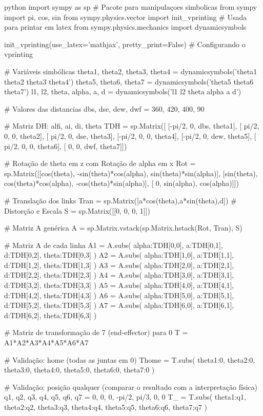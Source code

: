 \begin{mintedbox}{python}
import sympy as sp    # Pacote para manipulaçoes simbolicas
from sympy import pi, cos, sin
from sympy.physics.vector import init_vprinting   # Usada para printar em latex
from sympy.physics.mechanics import dynamicsymbols

init_vprinting(use_latex='mathjax', pretty_print=False)   # Configurando o vprinting

# Variáveis simbólicas
theta1, theta2, theta3, theta4 = dynamicsymbols('theta1 theta2 theta3 theta4')
theta5, theta6, theta7 = dynamicsymbols('theta5 theta6 theta7')
l1, l2, theta, alpha, a, d = dynamicsymbols('l1 l2 theta alpha a d')

# Valores das distancias
dbs, dse, dew, dwf = 360, 420, 400, 90

# Matriz DH:        alfi, ai,  di,  theta
TDH = sp.Matrix([ [-pi/2,  0, dbs, theta1],
                  [ pi/2,  0,   0, theta2],
                  [ pi/2,  0, dse, theta3],
                  [-pi/2,  0,   0, theta4],
                  [-pi/2,  0, dew, theta5],
                  [ pi/2,  0,   0, theta6],
                  [    0,  0, dwf, theta7]])

# Rotação de theta em z com Rotação de alpha em x
Rot = sp.Matrix([[cos(theta), -sin(theta)*cos(alpha),  sin(theta)*sin(alpha)],
                 [sin(theta),  cos(theta)*cos(alpha), -cos(theta)*sin(alpha)],
                 [         0,             sin(alpha),             cos(alpha)]])

# Translação dos links
Tran = sp.Matrix([a*cos(theta),a*sin(theta),d])
# Distorção e Escala
S = sp.Matrix([[0, 0, 0, 1]])

# Matriz A genérica
A = sp.Matrix.vstack(sp.Matrix.hstack(Rot, Tran), S)


# Matriz A de cada linha
A1 = A.subs({ alpha:TDH[0,0], a:TDH[0,1], d:TDH[0,2], theta:TDH[0,3] })
A2 = A.subs({ alpha:TDH[1,0], a:TDH[1,1], d:TDH[1,2], theta:TDH[1,3] })
A3 = A.subs({ alpha:TDH[2,0], a:TDH[2,1], d:TDH[2,2], theta:TDH[2,3] })
A4 = A.subs({ alpha:TDH[3,0], a:TDH[3,1], d:TDH[3,2], theta:TDH[3,3] })
A5 = A.subs({ alpha:TDH[4,0], a:TDH[4,1], d:TDH[4,2], theta:TDH[4,3] })
A6 = A.subs({ alpha:TDH[5,0], a:TDH[5,1], d:TDH[5,2], theta:TDH[5,3] })
A7 = A.subs({ alpha:TDH[6,0], a:TDH[6,1], d:TDH[6,2], theta:TDH[6,3] })

# Matriz de transformação de 7 (end-effector) para 0
T = A1*A2*A3*A4*A5*A6*A7

# Validação: home (todas as juntas em 0)
Thome = T.subs({ theta1:0, theta2:0, theta3:0, theta4:0, theta5:0, theta6:0, theta7:0 })

# Validação: posição qualquer (comparar o resultado com a interpretação física)
q1, q2, q3, q4, q5, q6, q7 = 0, 0, 0, -pi/2, pi/3, 0, 0
T_ = T.subs({ theta1:q1, theta2:q2, theta3:q3, theta4:q4, theta5:q5, theta6:q6, theta7:q7 })

\end{mintedbox}